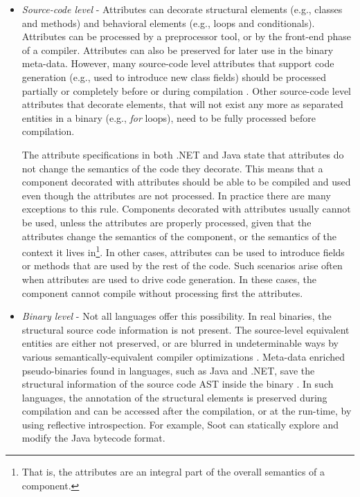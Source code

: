 \begin{itemize}
\item \textit{Source-code level} - Attributes can decorate structural elements (e.g., classes and methods) and behavioral elements (e.g., loops and conditionals). Attributes can be processed by a preprocessor tool, or by the front-end phase of a compiler. Attributes can also be preserved for later use in the binary meta-data. However, many source-code level attributes that support code generation (e.g., used to introduce new class fields) should be processed partially or completely before or during compilation . Other source-code level attributes that decorate elements, that will not exist any more as separated entities in a binary (e.g., \textit{for} loops), need to be fully processed before compilation.

The attribute specifications in both .NET\cite{www.dotnet} and Java \cite{www.java.meta} state that attributes do not change the semantics of the code they decorate. This means that a component decorated with attributes should be able to be compiled and used even though the attributes are not processed. In practice there are many exceptions to this rule. Components decorated with attributes usually cannot be used, unless the attributes are properly processed, given that the attributes change the semantics of the component, or the semantics of the context \cite{.net.context.attrib} it lives in\footnote{That is, the attributes are an integral part of the overall semantics of a component.}. In other cases, attributes can be used to introduce fields or methods that are used by the rest of the code. Such scenarios arise often when attributes are used to drive code generation. In these cases, the component cannot compile without processing first the attributes.

\item \textit{Binary level} - Not all languages offer this possibility. In real binaries, the structural source code information is not present. The source-level equivalent entities are either not preserved, or are blurred in undeterminable ways by various semantically-equivalent compiler optimizations \cite{muchnick.97}. Meta-data enriched pseudo-binaries found in languages, such as Java and .NET, save the structural information of the source code AST inside the binary . In such languages, the annotation of the structural elements is preserved during compilation and can be accessed after the compilation, or at the run-time, by using reflective introspection. For example, Soot \cite{soot.00} can statically explore and modify the Java bytecode format.


\end{itemize}
